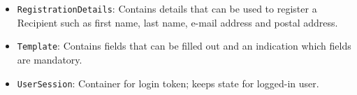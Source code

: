 \documentclass[a4paper,10pt]{article}
\begin{document}
\begin{itemize}
    \item \texttt{RegistrationDetails}: Contains details that can be used to register a Recipient such as first name, last name, e-mail address and postal address.
    \item \texttt{Template}: Contains fields that can be filled out and an indication which fields are mandatory.
    \item \texttt{UserSession}: Container for login token; keeps state for logged-in user.
\end{itemize}
\end{document}
